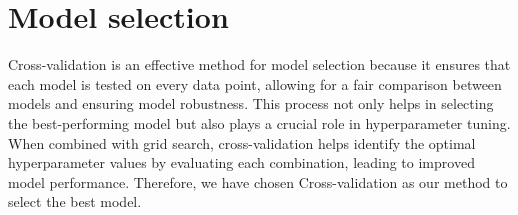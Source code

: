 \section{Model selection}
Cross-validation is an effective method for model selection because it ensures that each model is tested on every data point, allowing for a fair comparison between models and ensuring model robustness.
This process not only helps in selecting the best-performing model but also plays a crucial role in hyperparameter tuning. 
When combined with grid search, cross-validation helps identify the optimal hyperparameter values by evaluating each combination, leading to improved model performance.
Therefore, we have chosen Cross-validation as our method to select the best model.
